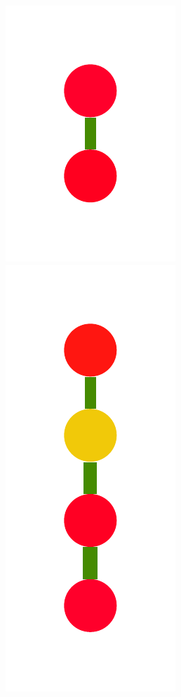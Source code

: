 \documentclass[a4paper,10pt]{article}
\begin{document}
\begin{figure}
{    \includegraphics[scale=.14]{./figures/6-3-recursion-induced-5.pdf}
    \includegraphics[scale=.14]{./figures/6-3-recursion-induced-6.pdf}
}
\end{figure}
\end{document}
